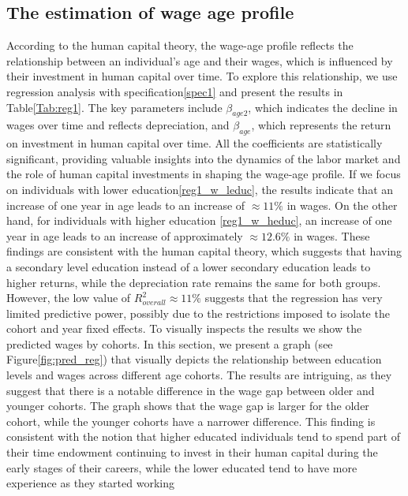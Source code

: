 \documentclass[12pt]{article}
\begin{document}
\subsection{The estimation of wage age profile}
According to the human capital theory, the wage-age profile reflects the relationship between an individual's age and
their wages, which is influenced by their investment in human capital over time. To explore this relationship, we use
regression analysis with specification\ref{spec1} and present the results in Table\ref{Tab:reg1}. The key parameters
include $\beta_{age2}$, which indicates the decline in wages over time and reflects depreciation, and $\beta_{age}$,
which represents the return on investment in human capital over time. All the coefficients are statistically
significant, providing valuable insights into the dynamics of the labor market and the role of human capital investments
in shaping the wage-age profile.
\newline
If we focus on individuals with lower education\ref{reg1_w_leduc}, the results indicate that an increase of one year in
age leads to an increase of $\approx 11\%$ in wages. On the other hand, for individuals with higher education
\ref{reg1_w_heduc}, an increase of one year in age leads to an increase of approximately $\approx 12.6\%$ in wages. These findings
are consistent with the human capital theory, which suggests that having a secondary level education instead of a lower
secondary education leads to higher returns, while the depreciation rate remains the same for both groups. However, the low value
of $R_{overall}^2 \approx 11\%$ suggests that the regression has very limited predictive power, possibly due to the restrictions imposed to
isolate the cohort and year fixed effects.
\newline
To visually inspects the results we show the predicted wages by cohorts.
\newline
In this section, we present a graph (see Figure\ref{fig:pred_reg}) that visually depicts the relationship between
education levels and wages across different age cohorts. The results are intriguing, as they suggest that there is a
notable difference in the wage gap between older and younger cohorts. The graph shows that the wage gap is larger for
the older cohort, while the younger cohorts have a narrower difference. This finding is consistent with the notion that
higher educated individuals tend to spend part of their time endowment continuing to invest in their human capital
during the early stages of their careers, while the lower educated tend to have more experience as they started working
\end{document}
